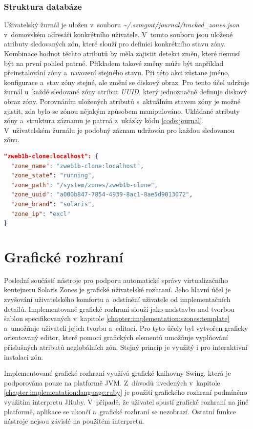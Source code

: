 \subsubsection{Struktura databáze}
\label{chapter:implementation:client:journal:database}
Uživatelský žurnál je uložen v~souboru \textit{\textasciitilde/.szmgmt/journal/tracked\_zones.json} v~domovském adresáři
konkrétního uživatele. V~tomto souboru jsou uložené atributy sledovaných zón, které slouží pro definici konkrétního stavu zóny.
Kombinace hodnot těchto atributů by měla zajistit detekci změn, které nemusí být na první pohled patrné. Příkladem takové změny
může být například přeinstalování zóny a~navození stejného stavu. Při této akci zůstane jméno, konfigurace a~stav zóny stejné,
ale změní se diskový obraz. Pro tento účel udržuje žurnál u~každé sledované zóny atribut \textit{UUID}, který jednoznačně
definuje diskový obraz zóny. Porovnáním uložených atributů s~aktuálním stavem zóny je možné zjistit, zda bylo se zónou 
nějakým způsobem manipulováno. Ukládané atributy zóny a~struktura záznamu je patrná z~ukázky kódu \ref{code:journal}.
V~uživatelském žurnálu je podobný záznam udržován pro každou sledovanou zónu.
\begin{lstlisting}[language=json, caption={Záznam stavu zóny v~žurnálu}, float,label={code:journal}]  
"zweb1b-clone:localhost": {
  "zone_name": "zweb1b-clone:localhost",
  "zone_state": "running",
  "zone_path": "/system/zones/zweb1b-clone",
  "zone_uuid": "a000b847-7854-4939-8ac1-8ae5d9013072",
  "zone_brand": "solaris",
  "zone_ip": "excl"
}
\end{lstlisting}
\section{Grafické rozhraní}
\label{chapter:implementation:gui}
Poslední součástí nástroje pro podporu automatické správy virtualizačního kontejneru Solaris Zones je grafické uživatelské 
rozhraní. Jeho hlavní účel je zvyšování uživatelského komfortu a~odstínění uživatele od implementačních detailů. 
Implementované grafické rozhraní slouží jako nadstavba nad tvorbou šablon specifikovaných v~kapitole \ref{chapter:implementation:szones:template}
a~umožňuje uživateli jejich tvorbu a~editaci. Pro tyto účely byl vytvořen graficky orientovaný editor, které pomocí grafických
elementů umožňuje vyplňování příslušných atributů neglobálních zón. Stejný princip je využitý i pro interaktivní instalaci 
zón.

Implementované grafické rozhraní využívá grafické knihovny Swing, která je podporována pouze na platformě JVM. Z~důvodů uvedených
v~kapitole \ref{chapter:implementation:language:ruby} je použití grafického rozhraní podmíněno využitím interpretu JRuby.
V~případě, že uživatel spustí grafické rozhraní na jiné platformě, aplikace se ukončí a~grafické rozhraní se nezobrazí. Ostatní
funkce nástroje nejsou závislé na použitém interpretu.
